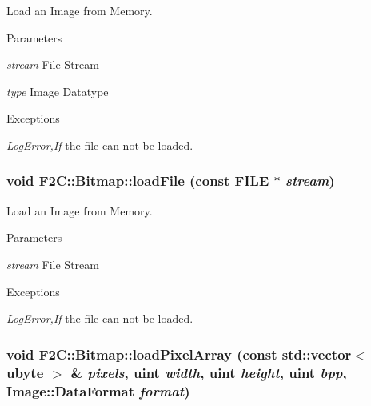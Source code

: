 Load an Image from Memory. 
\begin{DoxyParams}{Parameters}
\item[{\em stream}]File Stream \item[{\em type}]Image Datatype \end{DoxyParams}

\begin{DoxyExceptions}{Exceptions}
\item[{\em \hyperlink{class_f2_c_1_1_log_error}{LogError},If}]the file can not be loaded. \end{DoxyExceptions}
\hypertarget{class_f2_c_1_1_bitmap_a35e942d308eed291f55112880e6f374b}{
\subsubsection[{loadFile}]{\setlength{\rightskip}{0pt plus 5cm}void F2C::Bitmap::loadFile (const FILE $\ast$ {\em stream})}}
\label{class_f2_c_1_1_bitmap_a35e942d308eed291f55112880e6f374b}


Load an Image from Memory. 
\begin{DoxyParams}{Parameters}
\item[{\em stream}]File Stream \end{DoxyParams}

\begin{DoxyExceptions}{Exceptions}
\item[{\em \hyperlink{class_f2_c_1_1_log_error}{LogError},If}]the file can not be loaded. \end{DoxyExceptions}
\hypertarget{class_f2_c_1_1_bitmap_ae707e2e499d1bc72465be4ac739bccfa}{
\subsubsection[{loadPixelArray}]{\setlength{\rightskip}{0pt plus 5cm}void F2C::Bitmap::loadPixelArray (const std::vector$<$ {\bf ubyte} $>$ \& {\em pixels}, \/  {\bf uint} {\em width}, \/  {\bf uint} {\em height}, \/  {\bf uint} {\em bpp}, \/  Image::DataFormat {\em format})}}
\label{class_f2_c_1_1_bitmap_ae707e2e499d1bc72465be4ac739bccfa}


